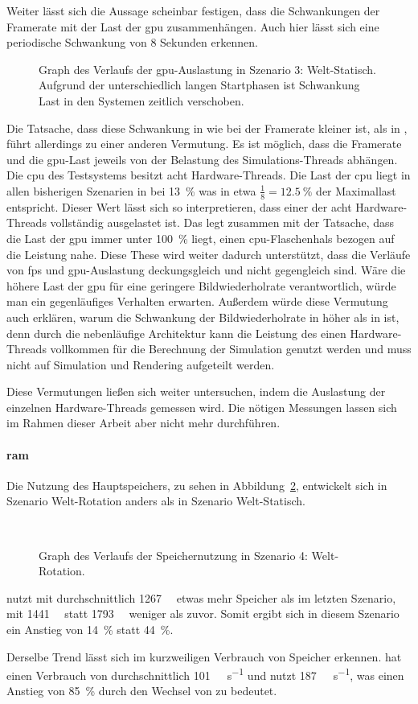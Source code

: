 Weiter lässt sich die Aussage scheinbar festigen, dass die Schwankungen der Framerate mit der Last der \ac{gpu} zusammenhängen. Auch hier lässt sich eine periodische Schwankung von 8 Sekunden erkennen. 
\begin{figure}[!htbp]
	\caption[Graph des Verlaufs der -Auslastung in Szenario 4: Welt-Rotation.]{Graph des Verlaufs der \ac{gpu}-Auslastung in Szenario 3: Welt-Statisch. Aufgrund der unterschiedlich langen Startphasen ist Schwankung Last in den Systemen zeitlich verschoben.}\label{fig:seed-0-rotate-gpu}
\end{figure}
Die Tatsache, dass diese Schwankung in \sysA{} wie bei der Framerate kleiner ist, als in \sysB{}, führt allerdings zu einer anderen Vermutung. Es ist möglich, dass die Framerate und die \ac{gpu}-Last jeweils von der Belastung des Simulations-Threads abhängen. Die \ac{cpu} des Testsystems besitzt acht Hardware-Threads. Die Last der \ac{cpu} liegt in allen bisherigen Szenarien in \sysA{} bei \SI{13}{\percent} was in etwa $\frac{1}{8} = \SI{12,5}{\percent}$ der Maximallast entspricht. Dieser Wert lässt sich so interpretieren, dass einer der acht Hardware-Threads vollständig ausgelastet ist. Das legt zusammen mit der Tatsache, dass die Last der \ac{gpu} immer unter \SI{100}{\percent} liegt, einen \ac{cpu}-Flaschenhals bezogen auf die Leistung nahe. Diese These wird weiter dadurch unterstützt, dass die Verläufe von \ac{fps} und \ac{gpu}-Auslastung deckungsgleich und nicht gegengleich sind. Wäre die höhere Last der \ac{gpu} für eine geringere Bildwiederholrate verantwortlich, würde man ein gegenläufiges Verhalten erwarten. Außerdem würde diese Vermutung auch erklären, warum die Schwankung der Bildwiederholrate in \sysB{} höher als in \sysA{} ist, denn durch die nebenläufige Architektur kann die Leistung des einen Hardware-Threads vollkommen für die Berechnung der Simulation genutzt werden und muss nicht auf Simulation und Rendering aufgeteilt werden.

Diese Vermutungen ließen sich weiter untersuchen, indem die Auslastung der einzelnen Hardware-Threads gemessen wird. Die nötigen Messungen lassen sich im Rahmen dieser Arbeit aber nicht mehr durchführen. 

\paragraph{\ac{ram}}
Die Nutzung des Hauptspeichers, zu sehen in Abbildung~\ref{fig:seed-0-rotate-mem}, entwickelt sich in Szenario Welt-Rotation anders als in Szenario Welt-Statisch.
\begin{figure}[!htbp]
	\\
	\caption{Graph des Verlaufs der Speichernutzung in Szenario 4: Welt-Rotation.}\label{fig:seed-0-rotate-mem}	
\end{figure} 
\sysA{} nutzt mit durchschnittlich \SI{1267}{\mega\byte} etwas mehr Speicher als im letzten Szenario, \sysB{} mit \SI{1441}{\mega\byte} statt \SI{1793}{\mega\byte} weniger als zuvor. Somit ergibt sich in diesem Szenario ein Anstieg von \SI{14}{\percent} statt \SI{44}{\percent}. 

Derselbe Trend lässt sich im kurzweiligen Verbrauch von Speicher erkennen. \sysA{} hat einen Verbrauch von durchschnittlich \SI{101}{\mega\byte\per\second} und \sysB{} nutzt \SI{187}{\mega\byte\per\second}, was einen Anstieg von \SI{85}{\percent} durch den Wechsel von \sysA{} zu \sysB{} bedeutet.
